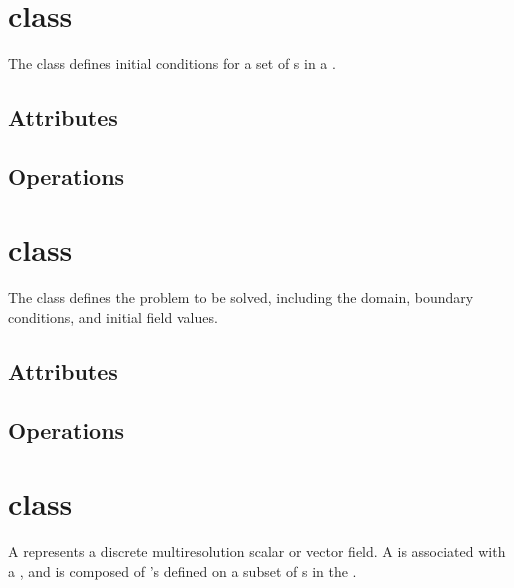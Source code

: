 \section{ class}

The  class defines initial conditions for a set of
s in a .


\subsection{Attributes}

\subsection{Operations}

\section{ class}

The  class defines the problem to be solved, including
the domain, boundary conditions, and initial field values.


\subsection{Attributes}

\subsection{Operations}

\section{ class} \label{ss:field}

A  represents a discrete multiresolution scalar or vector
field.  A  is associated with a , and is
composed of 's defined on a subset of s in the
.

